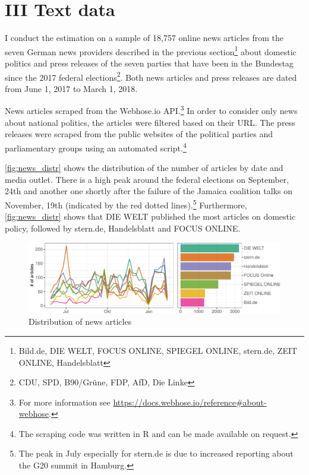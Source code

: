 \documentclass[
]{article}
\begin{document}
\hypertarget{iii-text-data}{%
\section{III Text data}\label{iii-text-data}}

I conduct the estimation on a sample of 18,757 online news articles from
the seven German news providers described in the previous
section\footnote{Bild.de, DIE WELT, FOCUS ONLINE, SPIEGEL ONLINE,
  stern.de, ZEIT ONLINE, Handelsblatt} about domestic politics and press
releases of the seven parties that have been in the Bundestag since the
2017 federal elections\footnote{CDU, SPD, B90/Grüne, FDP, AfD, Die Linke}.
Both news articles and press releases are dated from June 1, 2017 to
March 1, 2018.

News articles scraped from the Webhose.io API.\footnote{For more
  information see
  \url{https://docs.webhose.io/reference\#about-webhose}.} In order to
consider only news about national politics, the articles were filtered
based on their URL. The press releases were scraped from the public
websites of the political parties and parliamentary groups using an
automated script.\footnote{The scraping code was written in R and can be
  made available on request.}

\autoref{fig:news_distr} shows the distribution of the number of
articles by date and media outlet. There is a high peak around the
federal elections on September, 24th and another one shortly after the
failure of the Jamaica coalition talks on November, 19th (indicated by
the red dotted lines).\footnote{The peak in July especially for stern.de
  is due to increased reporting about the G20 summit in Hamburg.}
Furthermore, \autoref{fig:news_distr} shows that DIE WELT published the
most articles on domestic policy, followed by stern.de, Handelsblatt and
FOCUS ONLINE.

\begin{figure}

{\centering \includegraphics[width=0.7\linewidth]{main_text_files/figure-latex/Distribution of news articles-1} 

}

\caption{Distribution of news articles \label{fig:news_distr}}\label{fig:Distribution of news articles}
\end{figure}
\end{document}
